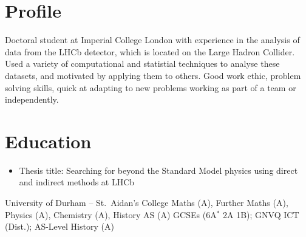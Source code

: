 \makecvtitle
\vspace{-1em}

\section{Profile}
\cvline{}{}
{
  Doctoral student at Imperial College London with experience in the analysis of data
  from the LHCb detector, which is located on the Large Hadron Collider.
  Used a variety of computational and statistial techniques to analyse these datasets, and
  motivated by applying them to others.
  Good work ethic, problem solving skills, quick at adapting to new problems working as part of a
  team or independently.

}


\section{Education}
{
  \begin{itemize}
    \item Thesis title:
      Searching for beyond the Standard Model physics using direct and indirect methods at
      LHCb
  \end{itemize}
}
{University of Durham {\color{color2} -- St.~Aidan's College}}{}{}{}
{Maths (A), Further Maths (A), Physics (A), Chemistry (A), History AS (A)}
{GCSEs (6A$^*$ 2A 1B); GNVQ ICT (Dist.); AS-Level History (A)}

